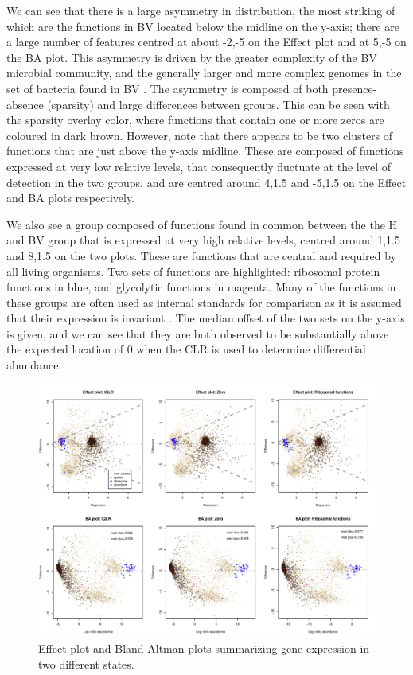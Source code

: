 \documentclass[10pt]{article}
\begin{document}
We can see that there is a large asymmetry in distribution, the most striking of which are the functions in BV located below the midline on the y-axis; there are a large number of features centred at about -2,-5 on the Effect plot and at 5,-5 on the BA plot. This asymmetry is driven by the greater complexity of the BV microbial community, and the generally larger and more complex genomes in the set of bacteria found in BV . The asymmetry is composed of both presence-absence (sparsity) and large differences between groups. This can be seen with the sparsity overlay color, where functions that contain one or more zeros are coloured in dark brown. However, note that there appears to be two clusters of functions that are just above the y-axis midline. These are composed of functions expressed at very low relative levels, that consequently fluctuate at the level of detection in the two groups, and are centred around 4,1.5 and -5,1.5 on the Effect and BA plots respectively. 

We also see a group composed of functions found in common between the the H and BV group that is  expressed at very high relative levels, centred around 1,1.5 and 8,1.5 on the two plots. These are functions that are central and required by all living organisms. Two sets of functions are highlighted: ribosomal protein functions in blue, and glycolytic functions in magenta. Many of the functions in these groups are often used as internal standards for comparison as it is assumed that their expression is invariant . The median offset of the two sets on the y-axis is given, and we can see that they are both observed to be substantially above the expected location of 0 when the CLR is used to determine differential abundance.   

\begin{figure}[ht]
\includegraphics[width=5in]{../figures/twtyfr_corr.pdf}
\caption{Effect plot and Bland-Altman plots summarizing gene expression in two different states. }
\label{Fig:ribo}
\end{figure}
\end{document}
